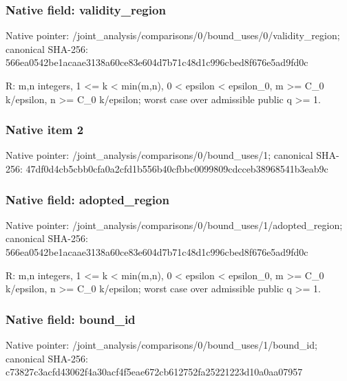 \documentclass[10pt,a4paper]{article}
\begin{document}
\subsubsection{Native field: validity\_\allowbreak{}region}
Native pointer: /joint\_\allowbreak{}analysis/comparisons/0/bound\_\allowbreak{}uses/0/validity\_\allowbreak{}region; canonical SHA-256: 566ea0542be1acaae3138a60ce83e604d7b71c48d1c996cbed8f676e5ad9fd0c

\begingroup\raggedright\sloppy R:\allowbreak{} m,\allowbreak{}n integers,\allowbreak{} 1 <=\allowbreak{} k < min(m,\allowbreak{}n),\allowbreak{} 0 < epsilon < epsilon\_\allowbreak{}0,\allowbreak{} m >=\allowbreak{} C\_\allowbreak{}0 k/\allowbreak{}epsilon,\allowbreak{} n >=\allowbreak{} C\_\allowbreak{}0 k/\allowbreak{}epsilon;\allowbreak{} worst case over admissible public q >=\allowbreak{} 1.\par\endgroup

\subsubsection{Native item 2}
Native pointer: /joint\_\allowbreak{}analysis/comparisons/0/bound\_\allowbreak{}uses/1; canonical SHA-256: 47df0d4cb5cbb0cfa0a2cfd1b556b40cfbbc0099809cdcceb38968541b3eab9c

\subsubsection{Native field: adopted\_\allowbreak{}region}
Native pointer: /joint\_\allowbreak{}analysis/comparisons/0/bound\_\allowbreak{}uses/1/adopted\_\allowbreak{}region; canonical SHA-256: 566ea0542be1acaae3138a60ce83e604d7b71c48d1c996cbed8f676e5ad9fd0c

\begingroup\raggedright\sloppy R:\allowbreak{} m,\allowbreak{}n integers,\allowbreak{} 1 <=\allowbreak{} k < min(m,\allowbreak{}n),\allowbreak{} 0 < epsilon < epsilon\_\allowbreak{}0,\allowbreak{} m >=\allowbreak{} C\_\allowbreak{}0 k/\allowbreak{}epsilon,\allowbreak{} n >=\allowbreak{} C\_\allowbreak{}0 k/\allowbreak{}epsilon;\allowbreak{} worst case over admissible public q >=\allowbreak{} 1.\par\endgroup

\subsubsection{Native field: bound\_\allowbreak{}id}
Native pointer: /joint\_\allowbreak{}analysis/comparisons/0/bound\_\allowbreak{}uses/1/bound\_\allowbreak{}id; canonical SHA-256: c73827c3acfd43062f4a30acf4f5eae672cb612752fa25221223d10a0aa07957
\end{document}
